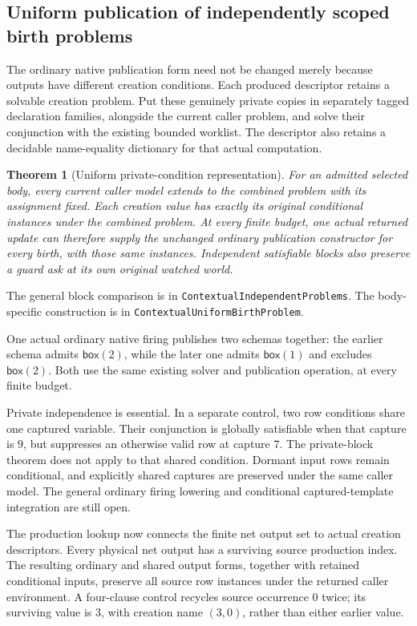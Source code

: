 \documentclass[11pt]{article}
\newtheorem{theorem}{Theorem}
\newcommand{\code}[1]{\texttt{\small #1}}
\begin{document}
\subsection{Uniform publication of independently scoped birth problems}

The ordinary native publication form need not be changed merely because
outputs have different creation conditions. Each produced descriptor
retains a solvable creation problem. Put these genuinely private copies
in separately tagged declaration families, alongside the current caller
problem, and solve their conjunction with the existing bounded worklist.
The descriptor also retains a decidable name-equality dictionary for
that actual computation.

\begin{theorem}[Uniform private-condition representation]
For an admitted selected body, every current caller model extends to
the combined problem with its assignment fixed. Each creation value has
exactly its original conditional instances under the combined problem.
At every finite budget, one actual returned update can therefore supply
the unchanged ordinary publication constructor for every birth, with
those same instances. Independent satisfiable blocks also preserve a
guard ask at its own original watched world.
\end{theorem}
The general block comparison is in
\code{ContextualIndependentProblems}.
The body-specific construction is in
\code{ContextualUniformBirthProblem}.

One actual ordinary native firing publishes two schemas together: the
earlier schema admits $\mathsf{box}(2)$, while the later one admits
$\mathsf{box}(1)$ and excludes $\mathsf{box}(2)$. Both use the same
existing solver and publication operation, at every finite budget.

Private independence is essential. In a separate control, two row
conditions share one captured variable. Their conjunction is globally
satisfiable when that capture is $9$, but suppresses an otherwise valid
row at capture $7$. The private-block theorem does not apply to that
shared condition. Dormant input rows remain conditional, and explicitly
shared captures are preserved under the same caller model. The general
ordinary firing lowering and conditional captured-template integration
are still open.

The production lookup now connects the finite net output set to actual
creation descriptors. Every physical net output has a surviving source
production index. The resulting ordinary and shared output forms, together
with retained conditional inputs, preserve all source row instances under
the returned caller environment. A four-clause control recycles source
occurrence $0$ twice; its surviving value is $3$, with creation name $(3,0)$,
rather than either earlier value.
\end{document}
